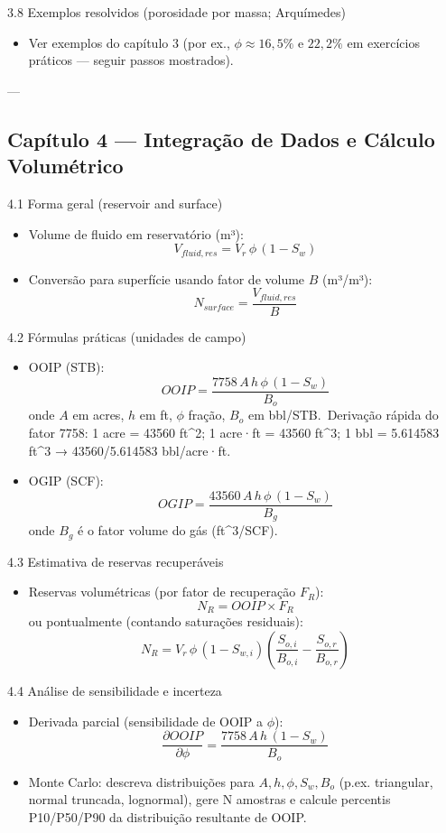 \documentclass[11pt,a4paper]{article}
\begin{document}
3.8 Exemplos resolvidos (porosidade por massa; Arquímedes)
\begin{itemize}
\item Ver exemplos do capítulo 3 (por ex., $\phi\approx16{,}5\%$ e $22{,}2\%$ em exercícios práticos — seguir passos mostrados).
\end{itemize}

---

\subsection{Capítulo 4 — Integração de Dados e Cálculo Volumétrico}

4.1 Forma geral (reservoir and surface)
\begin{itemize}
\item Volume de fluido em reservatório (m³):
$$V_{fluid,res}=V_r\,\phi\,(1-S_w)$$
\item Conversão para superfície usando fator de volume $B$ (m³/m³):
$$N_{surface}=\dfrac{V_{fluid,res}}{B}$$
\end{itemize}

4.2 Fórmulas práticas (unidades de campo)
\begin{itemize}
\item OOIP (STB):
$$OOIP=\dfrac{7758\,A\,h\,\phi\,(1-S_w)}{B_o}$$
onde $A$ em acres, $h$ em ft, $\phi$ fração, $B_o$ em bbl/STB.\
Derivação rápida do fator 7758:
1 acre = 43560 ft^2; 1 acre·ft = 43560 ft^3; 1 bbl = 5.614583 ft^3 → 43560/5.614583  bbl/acre·ft.
\end{itemize}

\begin{itemize}
\item OGIP (SCF):
$$OGIP=\dfrac{43560\,A\,h\,\phi\,(1-S_w)}{B_g}$$
onde $B_g$ é o fator volume do gás (ft^3/SCF).
\end{itemize}

4.3 Estimativa de reservas recuperáveis
\begin{itemize}
\item Reservas volumétricas (por fator de recuperação $F_R$):
$$N_R = OOIP\times F_R$$
ou pontualmente (contando saturações residuais):
$$N_R = V_r\,\phi\,(1-S_{w,i})\left(\dfrac{S_{o,i}}{B_{o,i}} - \dfrac{S_{o,r}}{B_{o,r}}\right)$$
\end{itemize}

4.4 Análise de sensibilidade e incerteza
\begin{itemize}
\item Derivada parcial (sensibilidade de OOIP a $\phi$):
$$\dfrac{\partial OOIP}{\partial\phi}=\dfrac{7758\,A\,h\,(1-S_w)}{B_o}$$
\item Monte Carlo: descreva distribuições para $A,h,\phi,S_w,B_o$ (p.ex. triangular, normal truncada, lognormal), gere N amostras e calcule percentis P10/P50/P90 da distribuição resultante de OOIP.
\end{itemize}
\end{document}

